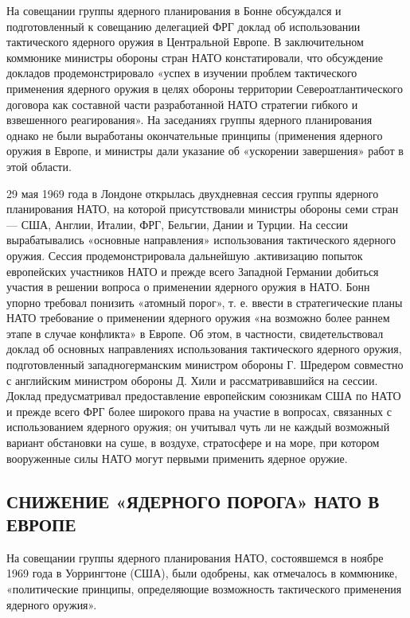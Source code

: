 \documentclass[12pt, a4paper, openany]{book}
\begin{document}
	На совещании группы ядерного планирования в Бонне обсуждался и подготовленный к совещанию делегацией ФРГ доклад об использовании тактического ядерного оружия в Центральной Европе. В заключительном коммюнике министры обороны стран НАТО констатировали, что обсуждение докладов продемонстрировало «успех в изучении проблем тактического применения ядерного оружия в целях обороны территории Североатлантического договора как составной части разработанной НАТО стратегии гибкого и взвешенного реагирования». На заседаниях группы ядерного планирования однако не были выработаны окончательные принципы (применения ядерного оружия в Европе, и министры дали указание об «ускорении завершения» работ в этой области.
	
	29 мая 1969 года в Лондоне открылась двухдневная сессия группы ядерного планирования НАТО, на которой присутствовали министры обороны семи стран — США, Англии, Италии, ФРГ, Бельгии, Дании и Турции. На сессии вырабатывались «основные направления» использования тактического ядерного оружия. Сессия продемонстрировала дальнейшую .активизацию попыток европейских участников НАТО и прежде всего Западной Германии добиться участия в решении вопроса о применении ядерного оружия в НАТО. Бонн упорно требовал понизить «атомный порог», т. е. ввести в стратегические планы НАТО требование о применении ядерного оружия «на возможно более раннем этапе в случае конфликта» в Европе. Об этом, в частности, свидетельствовал доклад об основных направлениях использования тактического ядерного оружия, подготовленный западногерманским министром обороны Г. Шредером совместно с английским министром обороны Д. Хили и рассматривавшийся на сессии. Доклад предусматривал предоставление европейским союзникам США по НАТО и прежде всего ФРГ более широкого права на участие в вопросах, связанных с использованием ядерного оружия; он учитывал чуть ли не каждый возможный вариант обстановки на суше, в воздухе, стратосфере и на море, при котором вооруженные силы НАТО могут первыми применить ядерное оружие.
	
	\subsection[Снижение «ядерного порога» НАТО в Европе]{\center СНИЖЕНИЕ «ЯДЕРНОГО ПОРОГА» НАТО В ЕВРОПЕ}	

	
	На совещании группы ядерного планирования НАТО, состоявшемся в ноябре 1969 года в Уоррингтоне (США), были одобрены, как отмечалось в коммюнике, «политические принципы, определяющие возможность тактического применения ядерного оружия».
	
\end{document}
